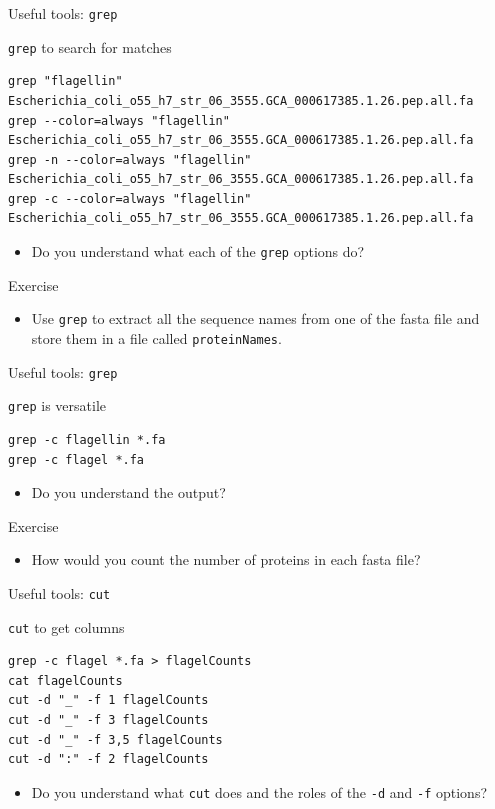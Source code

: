 \documentclass[big]{beamer}
\begin{document}
\begin{frame}[fragile,label=sec-3-3]{Useful tools: \texttt{grep}}
 \begin{block}{\texttt{grep} to search for matches}
\begin{verbatim}
grep "flagellin" Escherichia_coli_o55_h7_str_06_3555.GCA_000617385.1.26.pep.all.fa
grep --color=always "flagellin" Escherichia_coli_o55_h7_str_06_3555.GCA_000617385.1.26.pep.all.fa
grep -n --color=always "flagellin" Escherichia_coli_o55_h7_str_06_3555.GCA_000617385.1.26.pep.all.fa
grep -c --color=always "flagellin" Escherichia_coli_o55_h7_str_06_3555.GCA_000617385.1.26.pep.all.fa
\end{verbatim}
\begin{itemize}
\item Do you understand what each of the \texttt{grep} options do?
\end{itemize}
\end{block}
\begin{block}{Exercise}
\begin{itemize}
\item Use \texttt{grep} to extract all the sequence names from one of the fasta file and
store them in a file called \texttt{proteinNames}.
\end{itemize}
\end{block}
\end{frame}
\begin{frame}[fragile,label=sec-3-4]{Useful tools: \texttt{grep}}
 \begin{block}{\texttt{grep} is versatile}
\begin{verbatim}
grep -c flagellin *.fa
grep -c flagel *.fa
\end{verbatim}
\begin{itemize}
\item Do you understand the output?
\end{itemize}
\end{block}
\begin{block}{Exercise}
\begin{itemize}
\item How would you count the number of proteins in each fasta file?
\end{itemize}
\end{block}
\end{frame}
\begin{frame}[fragile,label=sec-3-5]{Useful tools: \texttt{cut}}
 \begin{block}{\texttt{cut} to get columns}
\begin{verbatim}
grep -c flagel *.fa > flagelCounts
cat flagelCounts
cut -d "_" -f 1 flagelCounts
cut -d "_" -f 3 flagelCounts
cut -d "_" -f 3,5 flagelCounts
cut -d ":" -f 2 flagelCounts
\end{verbatim}
\begin{itemize}
\item Do you understand what \texttt{cut} does and the roles of the \texttt{-d} and \texttt{-f} options?
\end{itemize}
\end{block}
\end{frame}
\end{document}

